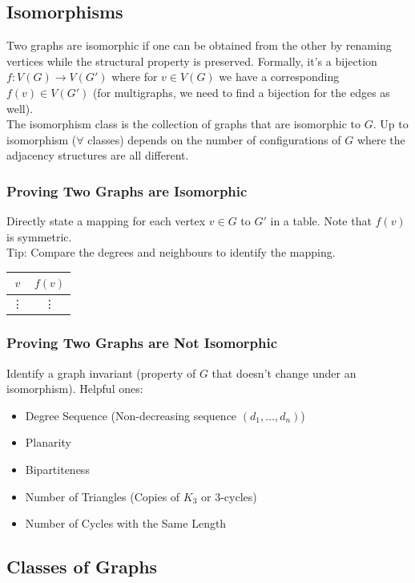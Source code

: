 \documentclass[11pt]{article}
\newcommand{\nl}{\\[5pt]}
\newcommand{\lstspacing}{\setlength\itemsep{1pt}}
\begin{document}
\subsection{Isomorphisms}
Two graphs are isomorphic if one can be obtained from the other by renaming vertices while the structural property is preserved. Formally, it's a bijection $f: V(G) \rightarrow V(G')$ where for $v \in V(G)$ we have a corresponding $f(v) \in V(G')$ (for multigraphs, we need to find a bijection for the edges as well). \nl
The isomorphism class is the collection of graphs that are isomorphic to $G$. Up to isomorphism ($\forall$ classes) depends on the number of configurations of $G$ where the adjacency structures are all different. 
\subsubsection{Proving Two Graphs are Isomorphic}
Directly state a mapping for each vertex $v \in G$ to $G'$ in a table. Note that $f(v)$ is symmetric. \nl 
Tip: Compare the degrees and neighbours to identify the mapping. 
\begin{center}
\begin{tabular}{c|c}
 $v$ & $f(v)$ \\
 \hline
 \vdots & \vdots 
\end{tabular}
\end{center}

\subsubsection{Proving Two Graphs are Not Isomorphic}
Identify a graph invariant (property of $G$ that doesn't change under an isomorphism). Helpful ones:
\begin{itemize}
\lstspacing
    \item Degree Sequence (Non-decreasing sequence $(d_1, \dots, d_n)$) 
    \item Planarity 
    \item Bipartiteness
    \item Number of Triangles (Copies of $K_3$ or 3-cycles)
    \item Number of Cycles with the Same Length
\end{itemize}

\subsection{Classes of Graphs}
\end{document}
